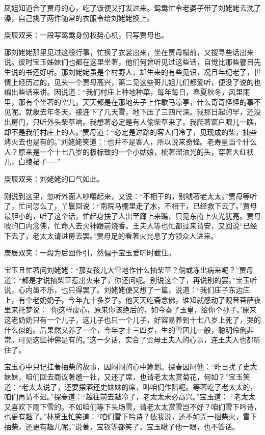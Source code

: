 \begin{parag}
    凤姐知道合了贾母的心，吃了饭便又打发过来。鸳鸯忙令老婆子带了刘姥姥去洗了澡，自己挑了两件随常的衣服令给刘姥姥换上。\begin{note}庚辰双夹：一段写鸳鸯身份权势心机，只写贾母也。\end{note}那刘姥姥那里见过这般行事，忙换了衣裳出来，坐在贾母榻前，又搜寻些话出来说。彼时宝玉姊妹们也都在这里坐著，他们何曾听见过这些话，自觉比那些瞽目先生说的书还好听。那刘姥姥虽是个村野人，却生来的有些见识，况且年纪老了，世情上经历过的，见头一个贾母高兴，第二见这些哥儿姐儿们都爱听，便没了说的也编出些话来讲。因说道：“我们村庄上种地种菜，每年每日，春夏秋冬，风里雨里，那有个坐著的空儿，天天都是在那地头子上作歇马凉亭，什么奇奇怪怪的事不见呢。就象去年冬天，接连下了几天雪，地下压了三四尺深。我那日起的早，还没出房门，只听外头柴草响。我想著必定是有人偷柴草来了。我爬著窗户眼儿一瞧，却不是我们村庄上的人。”贾母道：“必定是过路的客人们冷了，见现成的柴，抽些烤火去也是有的。”刘姥姥笑道：“也并不是客人，所以说来奇怪。老寿星当个什么人？原来是一个十七八岁的极标致的一个小姑娘，梳著溜油光的头，穿著大红袄儿，白绫裙子──”\begin{note}庚辰双夹：刘姥姥的口气如此。\end{note}刚说到这里，忽听外面人吵嚷起来，又说：“不相干的，别唬著老太太。”贾母等听了，忙问怎么了，丫鬟回说：“南院马棚里走了水，不相干，已经救下去了。”贾母最胆小的，听了这个话，忙起身扶了人出至廊上来瞧，只见东南上火光犹亮。贾母唬的口内念佛，忙命人去火神跟前烧香。王夫人等也忙都过来请安，又回说“已经下去了，老太太请进房去罢。”贾母足的看著火光息了方领众人进来。\begin{note}庚辰双夹：一段为后回作引，然偏于宝玉爱听时截住。\end{note}宝玉且忙著问刘姥姥：“那女孩儿大雪地作什么抽柴草？倘或冻出病来呢？”贾母道：“都是才说抽柴草惹出火来了，你还问呢。别说这个了，再说别的罢。”宝玉听说，心内虽不乐，也只得罢了。刘姥姥便又想了一篇，说道：“我们庄子东边庄上，有个老奶奶子，今年九十多岁了。他天天吃斋念佛，谁知就感动了观音菩萨夜里来托梦说： ‘你这样虔心，原来你该绝后的，如今奏了玉皇，给你个孙子。’原来这老奶奶只有一个儿子，这儿子也只一个儿子，好容易养到十七八岁上死了，哭的什么似的。后果然又养了一个，今年才十三四岁，生的雪团儿一般，聪明伶俐非常。可见这些神佛是有的。”这一夕话，实合了贾母王夫人的心事，连王夫人也都听住了。
\end{parag}


\begin{parag}
    宝玉心中只记挂著抽柴的故事，因闷闷的心中筹划。探春因问他：“昨日扰了史大妹妹，咱们回去商议著邀一社，又还了席，也请老太太赏菊花，何如？”宝玉笑道：“老太太说了，还要摆酒还史妹妹的席，叫咱们作陪呢。等著吃了老太太的，咱们再请不迟。”探春道：“越往前去越冷了，老太太未必高兴。”宝玉道： “老太太又喜欢下雨下雪的。不如咱们等下头场雪，请老太太赏雪岂不好？咱们雪下吟诗，也更有趣了。”林黛玉忙笑道：“咱们雪下吟诗？依我说，还不如弄一捆柴火，雪下抽柴，还更有趣儿呢。”说著，宝钗等都笑了。宝玉瞅了他一眼，也不答话。
\end{parag}


